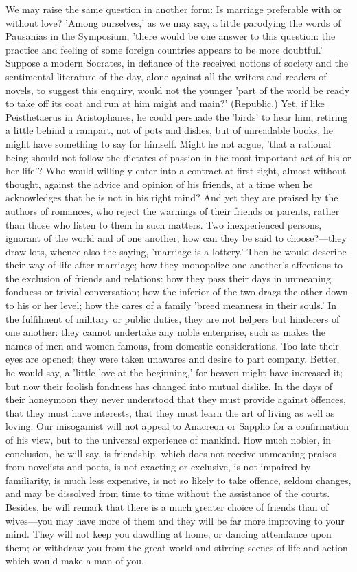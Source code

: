 \documentclass[11pt,letter]{article}
\begin{document}
\par  We may raise the same question in another form: Is marriage preferable with or without love? 'Among ourselves,' as we may say, a little parodying the words of Pausanias in the Symposium, 'there would be one answer to this question: the practice and feeling of some foreign countries appears to be more doubtful.' Suppose a modern Socrates, in defiance of the received notions of society and the sentimental literature of the day, alone against all the writers and readers of novels, to suggest this enquiry, would not the younger 'part of the world be ready to take off its coat and run at him might and main?' (Republic.) Yet, if like Peisthetaerus in Aristophanes, he could persuade the 'birds' to hear him, retiring a little behind a rampart, not of pots and dishes, but of unreadable books, he might have something to say for himself. Might he not argue, 'that a rational being should not follow the dictates of passion in the most important act of his or her life'? Who would willingly enter into a contract at first sight, almost without thought, against the advice and opinion of his friends, at a time when he acknowledges that he is not in his right mind? And yet they are praised by the authors of romances, who reject the warnings of their friends or parents, rather than those who listen to them in such matters. Two inexperienced persons, ignorant of the world and of one another, how can they be said to choose?—they draw lots, whence also the saying, 'marriage is a lottery.' Then he would describe their way of life after marriage; how they monopolize one another's affections to the exclusion of friends and relations: how they pass their days in unmeaning fondness or trivial conversation; how the inferior of the two drags the other down to his or her level; how the cares of a family 'breed meanness in their souls.' In the fulfilment of military or public duties, they are not helpers but hinderers of one another: they cannot undertake any noble enterprise, such as makes the names of men and women famous, from domestic considerations. Too late their eyes are opened; they were taken unawares and desire to part company. Better, he would say, a 'little love at the beginning,' for heaven might have increased it; but now their foolish fondness has changed into mutual dislike. In the days of their honeymoon they never understood that they must provide against offences, that they must have interests, that they must learn the art of living as well as loving. Our misogamist will not appeal to Anacreon or Sappho for a confirmation of his view, but to the universal experience of mankind. How much nobler, in conclusion, he will say, is friendship, which does not receive unmeaning praises from novelists and poets, is not exacting or exclusive, is not impaired by familiarity, is much less expensive, is not so likely to take offence, seldom changes, and may be dissolved from time to time without the assistance of the courts. Besides, he will remark that there is a much greater choice of friends than of wives—you may have more of them and they will be far more improving to your mind. They will not keep you dawdling at home, or dancing attendance upon them; or withdraw you from the great world and stirring scenes of life and action which would make a man of you.
\end{document}
